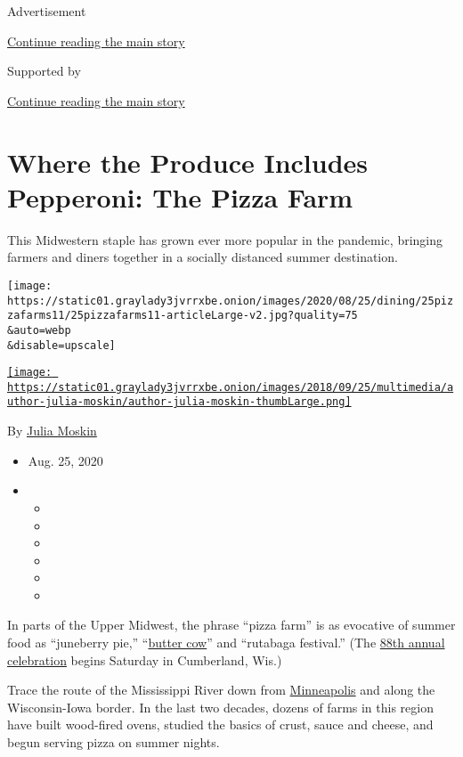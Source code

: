 Advertisement

\protect\hyperlink{after-top}{Continue reading the main story}

Supported by

\protect\hyperlink{after-sponsor}{Continue reading the main story}

\hypertarget{where-the-produce-includes-pepperoni-the-pizza-farm}{%
\section{Where the Produce Includes Pepperoni: The Pizza
Farm}\label{where-the-produce-includes-pepperoni-the-pizza-farm}}

This Midwestern staple has grown ever more popular in the pandemic,
bringing farmers and diners together in a socially distanced summer
destination.

\texttt{[image: https://static01.graylady3jvrrxbe.onion/images/2020/08/25/dining/25pizzafarms11/25pizzafarms11-articleLarge-v2.jpg?quality=75\\\&auto=webp\\\&disable=upscale]}

\href{https://www.nytimes3xbfgragh.onion/by/julia-moskin}{\texttt{[image: https://static01.graylady3jvrrxbe.onion/images/2018/09/25/multimedia/author-julia-moskin/author-julia-moskin-thumbLarge.png]}}

By \href{https://www.nytimes3xbfgragh.onion/by/julia-moskin}{Julia
Moskin}

\begin{itemize}
\item
  Aug. 25, 2020
\item
  \begin{itemize}
  \item
  \item
  \item
  \item
  \item
  \item
  \end{itemize}
\end{itemize}

In parts of the Upper Midwest, the phrase ``pizza farm'' is as evocative
of summer food as ``juneberry pie,''
``\href{https://www.nytimes3xbfgragh.onion/2019/08/12/us/politics/on-politics-iowa-fair-booker-ferris-wheel.html}{butter
cow}'' and ``rutabaga festival.'' (The
\href{http://www.cumberland-wisconsin.com/rutabaga-events-2020}{88th
annual celebration} begins Saturday in Cumberland, Wis.)

Trace the route of the Mississippi River down from
\href{https://twincities.eater.com/maps/pizza-farm-minnesota-wisconsin}{Minneapolis}
and along the Wisconsin-Iowa border. In the last two decades, dozens of
farms in this region have built wood-fired ovens, studied the basics of
crust, sauce and cheese, and begun serving pizza on summer nights.

